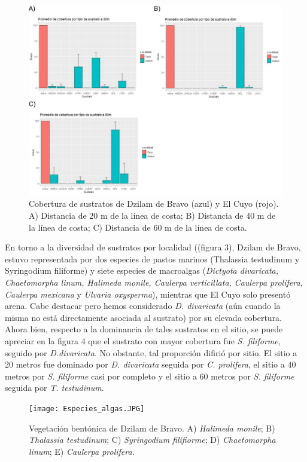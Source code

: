 \documentclass[
  authoryear,
  preprint,
  3p,
  twocolumn]{elsarticle}
\begin{document}
\begin{figure}

{\centering \includegraphics{Promedio_sustratos.JPG}

}

\caption{Cobertura de sustratos de Dzilam de Bravo (azul) y El Cuyo
(rojo). A) Distancia de 20 m de la línea de costa; B) Distancia de 40 m
de la línea de costa; C) Distancia de 60 m de la línea de costa.}

\end{figure}

En torno a la diversidad de sustratos por localidad ((figura 3), Dzilam
de Bravo, estuvo representada por dos especies de pastos marinos
(Thalassia testudinum y Syringodium filiforme) y siete especies de
macroalgas (\emph{Dictyota divaricata, Chaetomorpha linum, Halimeda
monile, Caulerpa verticillata, Caulerpa prolifera, Caulerpa mexicana} y
\emph{Ulvaria oxysperma}), mientras que El Cuyo solo presentó arena.
Cabe destacar pero hemos considerado \emph{D. divaricata} (aún cuando la
misma no está directamente asociada al sustrato) por su elevada
cobertura. Ahora bien, respecto a la dominancia de tales sustratos en el
sitio, se puede apreciar en la figura 4 que el sustrato con mayor
cobertura fue \emph{S. filiforme}, seguido por \emph{D.divaricata}. No
obstante, tal proporción difirió por sitio. El sitio a 20 metros fue
dominado por \emph{D. divaricata} seguida por \emph{C. prolifera}, el
sitio a 40 metros por \emph{S. filiforme} casi por completo y el sitio a
60 metros por \emph{S. filiforme} seguida por \emph{T. testudinum}.

\begin{figure}

{\centering \texttt{[image: Especies\_algas.JPG]}

}

\caption{Vegetación bentónica de Dzilam de Bravo. A) \emph{Halimeda
monile}; B) \emph{Thalassia testudinum}; C) \emph{Syringodium
filifiorme}; D) \emph{Chaetomorpha linum}; E) \emph{Caulerpa
prolifera.}}

\end{figure}
\end{document}
